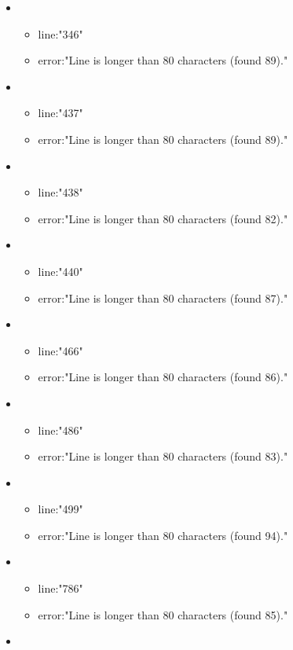 \begin{itemize}
	\item 
	\begin{itemize} 
		\item line:"346" 
		\item error:"Line is longer than 80 characters (found 89)." 
	\end{itemize}
	\item 
	\begin{itemize} 
		\item line:"437" 
		\item error:"Line is longer than 80 characters (found 89)." 
	\end{itemize}
	\item 
	\begin{itemize} 
		\item line:"438" 
		\item error:"Line is longer than 80 characters (found 82)." 
	\end{itemize}
	\item 
	\begin{itemize} 
		\item line:"440" 
		\item error:"Line is longer than 80 characters (found 87)." 
	\end{itemize}
	\item 
	\begin{itemize} 
		\item line:"466" 
		\item error:"Line is longer than 80 characters (found 86)." 
	\end{itemize}
	\item 
	\begin{itemize} 
		\item line:"486" 
		\item error:"Line is longer than 80 characters (found 83)." 
	\end{itemize}
	\item 
	\begin{itemize} 
		\item line:"499" 
		\item error:"Line is longer than 80 characters (found 94)." 
	\end{itemize}
	\item 
	\begin{itemize} 
		\item line:"786" 
		\item error:"Line is longer than 80 characters (found 85)." 
	\end{itemize}
	\item 

\end{itemize}
